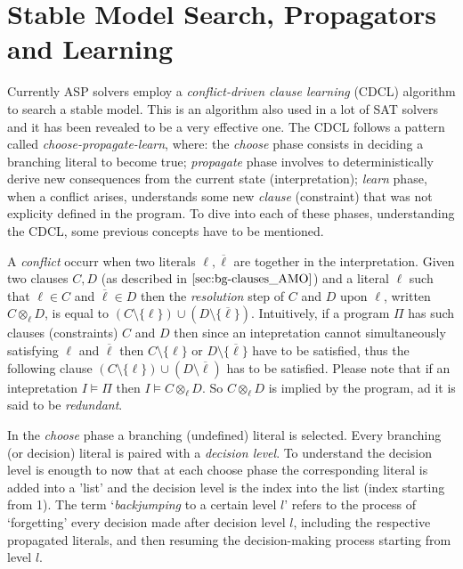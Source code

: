 \section{Stable Model Search, Propagators and Learning}
\label{sec:bg-SM}

Currently ASP solvers employ a \textit{conflict-driven clause learning} (CDCL) algorithm
\cite{DBLP:journals/ai/GebserKS12} to search a stable model.
This is an algorithm also used in a lot of SAT solvers and it has been revealed to be a 
very effective one.
The CDCL follows a pattern called \textit{choose-propagate-learn}, where: 
the \textit{choose} phase consists in deciding a branching literal to become true;
\textit{propagate} phase involves to deterministically derive new consequences from the current
state (interpretation); \textit{learn} phase, when a conflict arises, understands
some new \textit{clause} (constraint) that was not explicity defined in the program.
To dive into each of these phases, understanding the CDCL, some previous concepts have
to be mentioned.

A \textit{conflict} occurr when two literals $\ell, \overline{\ell}$ are together in the interpretation.
Given two clauses $C,D$ (as described in $\ref{sec:bg-clauses_AMO}$) and a literal 
$\ell$ such that $\ell \in C$ and $\overline{\ell} \in D$ then the \textit{resolution}
step of $C$ and $D$ upon $\ell$, written $C \otimes_{\ell} D$, is equal to 
$(C \setminus \{\ell\}) \cup (D \setminus \{\overline{\ell}\})$.
Intuitively, if a program $\Pi$ has such clauses (constraints) $C$ and $D$
then since an intepretation cannot simultaneously
satisfying $\ell$ and $\overline{\ell}$ then $C \setminus \{\ell\}$ or 
$D \setminus \{ \overline{\ell}\}$ have to be satisfied, thus the following clause 
$(C \setminus \{\ell\}) \cup (D \setminus \overline{\ell})$ has to be satisfied.
Please note that if an intepretation $I \models \Pi$ then $I \models C \otimes_{\ell} D$.
So $C \otimes_{\ell} D$ is implied by the program, ad it is said to be \textit{redundant}.


In the \textit{choose} phase a branching (undefined) literal is selected.
Every branching (or decision) literal is paired with a \textit{decision level}.
To understand the decision level is enougth to 
now that at each choose phase the corresponding literal is added into a 'list' and
the decision level is the index into the list (index starting from 1). 
The term `\textit{backjumping} to a certain level $l$' refers to the process of `forgetting' 
every decision made after decision level $l$, 
including the respective propagated literals, and then 
resuming the decision-making process starting from level $l$.



